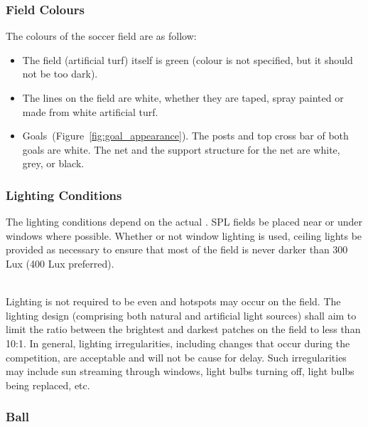 \subsubsection{Field Colours}
\label{sec:field_colors}
The colours of the soccer field are as follow:

\begin{itemize}
	\item The field (artificial turf) itself is green (colour is not specified, but it should not be too dark).
	
	\item The lines on the field are white, whether they are taped, spray painted or made from white artificial turf.
	
	\item Goals~(\cf Figure~\ref{fig:goal_appearance}). The posts and top cross bar of both goals are white. The net and the support structure for the net are white, grey, or black.
\end{itemize}

\subsubsection{Lighting Conditions}
\label{sec:lightConditions}
The lighting conditions depend on the actual . SPL fields  be placed near or under windows where possible. Whether or not window lighting is used, ceiling lights  be provided as necessary to ensure that most of the field is never darker than 300 Lux (400 Lux preferred).

 \\

Lighting is not required to be even and hotspots may occur on the field. The lighting design (comprising both natural and artificial light sources) shall aim to limit the ratio between the brightest and darkest patches on the field to less than 10:1. In general, lighting irregularities, including changes that occur during the competition, are acceptable and will not be cause for delay. Such irregularities may include sun streaming through windows, light bulbs turning off, light bulbs being replaced, etc.

\subsubsection{Ball}
\label{sec:ball}


